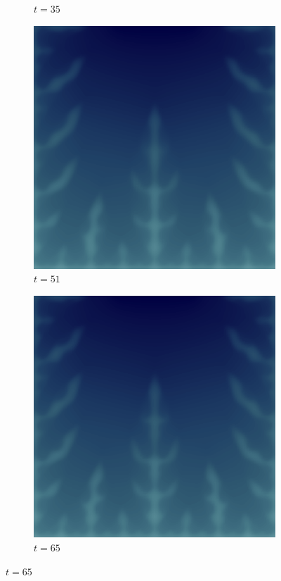 \begin{figure}[H]
\begin{subfigure}{.4\textwidth}
        \caption{$t = 35$}
    \end{subfigure}
    \begin{subfigure}{.4\textwidth}
        \includegraphics[width=\textwidth]{imgs/UnitSquare1_State/seventh.png}
        \caption{$t = 51$}
    \end{subfigure}
    \begin{subfigure}{.4\textwidth}
        \includegraphics[width=\textwidth]{imgs/UnitSquare1_State/eighth.png}
        \caption{$t = 65$}
    \end{subfigure}
\end{figure}

